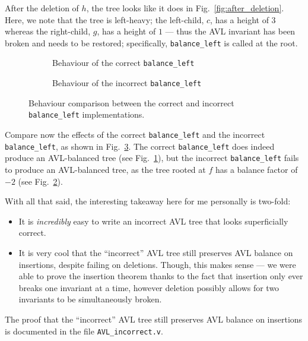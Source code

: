 \documentclass[acmsmall, authorversion, nonacm, overload]{acmart}
\begin{document}
After the deletion of $h$, the tree looks like it does in Fig.\ \ref{fig:after_deletion}.
Here, we note that the tree is left-heavy; the left-child, $c$, has a height of $3$ whereas the right-child, $g$,
has a height of $1$ --- thus the AVL invariant has been broken and needs to be restored;
specifically, \verb|balance_left| is called at the root.

\begin{figure}[!ht]
  \centering
  \begin{subfigure}{0.5\textwidth}
    \centering
  \caption{Behaviour of the correct \texttt{balance_left}%
  \label{fig:bal_left_correct}}
  \end{subfigure}%
  \begin{subfigure}{0.5\textwidth}
    \centering
  \caption{Behaviour of the incorrect \texttt{balance_left}%
  \label{fig:bal_left_incorrect}}
  \end{subfigure}
  \caption{Behaviour comparison between the correct and incorrect \texttt{balance_left} implementations.
  \label{fig:bal_left_comparison}}
\end{figure}

Compare now the effects of the correct \verb|balance_left| and the incorrect \verb|balance_left|,
as shown in Fig.\ \ref{fig:bal_left_comparison}.
The correct \verb|balance_left| does indeed produce an AVL-balanced tree
(see Fig.\ \ref{fig:bal_left_correct}),
but the incorrect \verb|balance_left| fails to produce an AVL-balanced tree,
as the tree rooted at $f$ has a balance factor of $-2$ (see Fig.\ \ref{fig:bal_left_incorrect}).

\indent
With all that said, the interesting takeaway here
for me personally is two-fold:
\begin{itemize}
\item It is \emph{incredibly} easy to write an incorrect AVL tree that looks superficially correct.
\item It is very cool that the ``incorrect'' AVL tree still preserves AVL balance on insertions,
  despite failing on deletions.
  Though, this makes sense --- we were able to prove the insertion theorem
  thanks to the fact that insertion only ever breaks one invariant at a time,
  however deletion possibly allows for two invariants to be simultaneously broken.
\end{itemize}
The proof that the ``incorrect'' AVL tree still preserves AVL balance on insertions
is documented in the file \verb|AVL_incorrect.v|.
\end{document}
